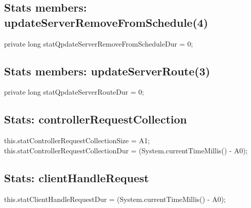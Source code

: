 \subsection{Stats members: updateServerRemoveFromSchedule(4)}
\nwenddocs{}\endmoddef{}
private long statQpdateServerRemoveFromScheduleDur = 0;
\nwendcode{}\nwdocspar

\subsection{Stats members: updateServerRoute(3)}
\nwenddocs{}\endmoddef{}
private long statQpdateServerRouteDur = 0;
\nwendcode{}\nwdocspar

\subsection{Stats: controllerRequestCollection}
\nwenddocs{}\endmoddef{}
this.statControllerRequestCollectionSize = A1;
this.statControllerRequestCollectionDur = (System.currentTimeMillis() - A0);
\nwendcode{}\nwdocspar

\subsection{Stats: clientHandleRequest}
\nwenddocs{}\endmoddef{}
this.statClientHandleRequestDur = (System.currentTimeMillis() - A0);
\nwendcode{}\nwdocspar

